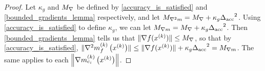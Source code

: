 \begin{proof}

Let $\kappa_g$ and ${M_{\nabla}}$ be defined by \cref{accuracy_is_satisfied} and \cref{bounded_gradients_lemma} respectively,
and let ${M_{\nabla^2 m}} = {M_{\nabla}} + \kappa_g {\Delta_{\textrm{acc}}}^2$.
Using \cref{accuracy_is_satisfied} to define $\kappa_g$, we can let ${M_{\nabla m}} = {M_{\nabla}} + \kappa_g {\Delta_{\textrm{acc}}}^2$.
Then \cref{bounded_gradients_lemma} tells us that
$\|\nabla f(x^{(k)})\| \le {M_{\nabla}}$, so that by \cref{accuracy_is_satisfied},
$\|{\nabla^2m_f^{(k)}\left(x^{(k)}\right)}\| \le \|\nabla f(x^{(k)})\| + \kappa_g{\Delta_{\textrm{acc}}}^2 = {M_{\nabla m}}$.
The same applies to each $\left\|{\nabla m_{c_i}^{(k)}\left(x^{(k)}\right)}\right\|$.
\end{proof}



